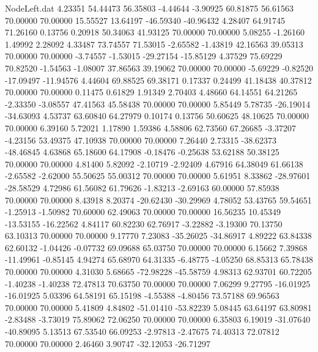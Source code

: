 \begin{filecontents}{NodeLeft.dat}
   4.23351   54.44473   56.35803    -4.44644   -3.90925   60.81875   56.61563   70.00000   70.00000   15.55527   13.64197  -46.59340  -40.96432
   4.28407   64.91745   71.26160     0.13756    0.20918   50.34063   41.93125   70.00000   70.00000    5.08255   -1.26160    1.49992    2.28092
   4.33487   73.74557   71.53015    -2.65582   -1.43819   42.16563   39.05313   70.00000   70.00000   -3.74557   -1.53015  -29.27154  -15.85129
   4.37529   75.69229   70.82520    -1.54563   -1.08007   37.86563   39.19062   70.00000   70.00000   -5.69229   -0.82520  -17.09497  -11.94576
   4.44604   69.88525   69.38171     0.17337    0.24499   41.18438   40.37812   70.00000   70.00000    0.11475    0.61829    1.91349    2.70403
   4.48660   64.14551   64.21265    -2.33350   -3.08557   47.41563   45.58438   70.00000   70.00000    5.85449    5.78735  -26.19014  -34.63093
   4.53737   63.60840   64.27979     0.10174    0.13756   50.60625   48.10625   70.00000   70.00000    6.39160    5.72021    1.17890    1.59386
   4.58806   62.73560   67.26685    -3.37207   -4.23156   53.49375   47.10938   70.00000   70.00000    7.26440    2.73315  -38.62373  -48.46845
   4.63868   65.18600   64.17908    -0.18476   -0.25638   53.62188   50.38125   70.00000   70.00000    4.81400    5.82092   -2.10719   -2.92409
   4.67916   64.38049   61.66138    -2.65582   -2.62000   55.50625   55.00312   70.00000   70.00000    5.61951    8.33862  -28.97601  -28.58529
   4.72986   61.56082   61.79626    -1.83213   -2.69163   60.00000   57.85938   70.00000   70.00000    8.43918    8.20374  -20.62430  -30.29969
   4.78052   53.43765   59.54651    -1.25913   -1.50982   70.60000   62.49063   70.00000   70.00000   16.56235   10.45349  -13.53155  -16.22562
   4.84117   60.82230   62.76917    -3.22882   -3.19300   70.13750   63.10313   70.00000   70.00000    9.17770    7.23083  -35.26025  -34.86917
   4.89222   63.84338   62.60132    -1.04426   -0.07732   69.09688   65.03750   70.00000   70.00000    6.15662    7.39868  -11.49961   -0.85145
   4.94274   65.68970   64.31335    -6.48775   -4.05250   68.85313   65.78438   70.00000   70.00000    4.31030    5.68665  -72.98228  -45.58759
   4.98313   62.93701   60.72205    -1.40238   -1.40238   72.47813   70.63750   70.00000   70.00000    7.06299    9.27795  -16.01925  -16.01925
   5.03396   64.58191   65.15198    -4.55388   -4.80456   73.57188   69.96563   70.00000   70.00000    5.41809    4.84802  -51.01410  -53.82239
   5.08445   63.64197   63.80981    -2.83488   -3.73019   75.89062   72.06250   70.00000   70.00000    6.35803    6.19019  -31.07640  -40.89095
   5.13513   67.53540   66.09253    -2.97813   -2.47675   74.40313   72.07812   70.00000   70.00000    2.46460    3.90747  -32.12053  -26.71297

\end{filecontents}

